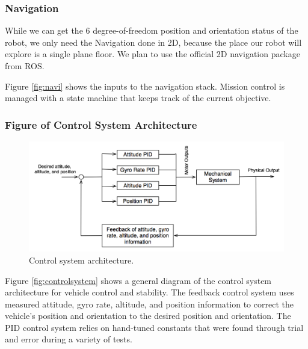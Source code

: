 \documentclass[12pt, letterpaper]{article}
\begin{document}

\subsubsection{Navigation}

While we can get the 6 degree-of-freedom position and orientation status of the robot, we only need the Navigation done in 2D, because the place our robot will explore is a single plane floor. We plan to use the official 2D navigation package from ROS.



Figure \eqref{fig:navi} shows the inputs to the navigation stack. Mission control is managed with a state machine that keeps track of the current objective.  

\subsubsection{Figure of Control System Architecture}

\begin{figure}[h]
\centering
\includegraphics[width=14cm]{images/Control-System-Diagram.png}
\caption{Control system architecture. } 
\label{fig:controlsystem}
\end{figure}

Figure \eqref{fig:controlsystem} shows a general diagram of the control system architecture for vehicle control and stability. The feedback control system uses measured attitude, gyro rate, altitude, and position information to correct the vehicle's position and orientation to the desired position and orientation. The PID control system relies on hand-tuned constants that were found through trial and error during a variety of tests. 
\end{document}
